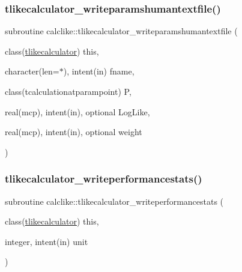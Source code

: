 \mbox{\label{namespacecalclike_afd9d4013e29fb891f656598d4b5e1b73}} 
\subsubsection{\texorpdfstring{tlikecalculator\+\_\+writeparamshumantextfile()}{tlikecalculator\_writeparamshumantextfile()}}
{\footnotesize\ttfamily subroutine calclike\+::tlikecalculator\+\_\+writeparamshumantextfile (\begin{DoxyParamCaption}\item[{class(\mbox{\hyperlink{structcalclike_1_1tlikecalculator}{tlikecalculator}})}]{this,  }\item[{character(len=$\ast$), intent(in)}]{fname,  }\item[{class(tcalculationatparampoint)}]{P,  }\item[{real(mcp), intent(in), optional}]{Log\+Like,  }\item[{real(mcp), intent(in), optional}]{weight }\end{DoxyParamCaption})\hspace{0.3cm}{\ttfamily [private]}}

\mbox{\label{namespacecalclike_a5158b85ddca7d8f1b417a813bb7fe849}} 
\subsubsection{\texorpdfstring{tlikecalculator\+\_\+writeperformancestats()}{tlikecalculator\_writeperformancestats()}}
{\footnotesize\ttfamily subroutine calclike\+::tlikecalculator\+\_\+writeperformancestats (\begin{DoxyParamCaption}\item[{class(\mbox{\hyperlink{structcalclike_1_1tlikecalculator}{tlikecalculator}})}]{this,  }\item[{integer, intent(in)}]{unit }\end{DoxyParamCaption})\hspace{0.3cm}{\ttfamily [private]}}

